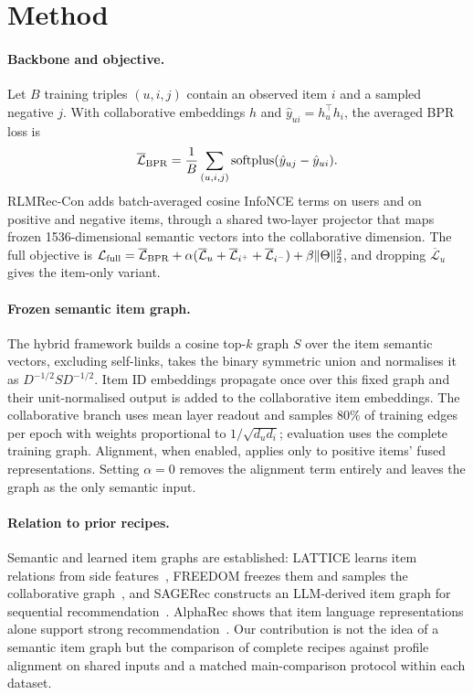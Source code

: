 \documentclass[runningheads]{llncs}
\begin{document}
\section{Method}
\paragraph{Backbone and objective.}
Let $B$ training triples $(u,i,j)$ contain an observed item $i$ and a sampled
negative $j$. With collaborative embeddings $h$ and $\hat y_{ui}=h_u^\top h_i$,
the averaged BPR loss is
\begin{equation}
 \overline{\mathcal L}_{\rm BPR}=\frac{1}{B}\sum_{(u,i,j)}
 \operatorname{softplus}(\hat y_{uj}-\hat y_{ui}).
\end{equation}
RLMRec-Con adds batch-averaged cosine InfoNCE terms on users and on positive
and negative items, through a shared two-layer projector that maps frozen
1536-dimensional semantic vectors into the collaborative dimension. The full
objective is $\mathcal L_{\rm full}=\overline{\mathcal L}_{\rm BPR}
+\alpha(\overline{\mathcal L}_u+\overline{\mathcal L}_{i^+}
+\overline{\mathcal L}_{i^-})+\beta\|\Theta\|_2^2$, and dropping
$\overline{\mathcal L}_u$ gives the item-only variant.

\paragraph{Frozen semantic item graph.}
The hybrid framework builds a cosine top-$k$ graph $S$ over the item semantic vectors,
excluding self-links, takes the binary symmetric union and normalises it as
$D^{-1/2}SD^{-1/2}$. Item ID embeddings propagate once over this fixed graph and
their unit-normalised output is added to the collaborative item embeddings. The
collaborative branch uses mean layer readout and samples $80\%$ of training
edges per epoch with weights proportional to $1/\sqrt{d_ud_i}$; evaluation uses
the complete training graph. Alignment, when enabled, applies only to positive
items' fused representations. Setting $\alpha=0$ removes the alignment term
entirely and leaves the graph as the only semantic input.

\paragraph{Relation to prior recipes.}
Semantic and learned item graphs are established: LATTICE learns item relations
from side features~\cite{lattice}, FREEDOM freezes them and samples the
collaborative graph~\cite{freedom}, and SAGERec constructs an LLM-derived item
graph for sequential recommendation~\cite{sagerec}. AlphaRec shows that item
language representations alone support strong recommendation~\cite{alpharec}.
Our contribution is not the idea of a semantic item graph but the comparison of complete recipes against profile alignment on shared
inputs and a matched main-comparison protocol within each dataset.
\end{document}

